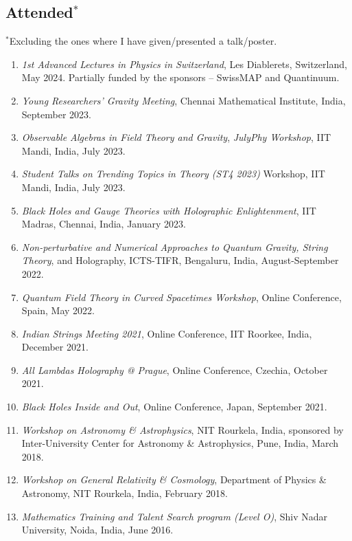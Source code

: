 \documentclass[11pt, letterpaper]{article}
\begin{document}
	\subsection{Attended$^*$}
	$^*$Excluding the ones where I have given/presented a talk/poster.
	\begin{enumerate}
		\item \textit{1st Advanced Lectures in Physics in Switzerland}, Les Diablerets, Switzerland, May 2024. Partially funded by the sponsors -- SwissMAP and Quantinuum.
		
		\item \textit{Young Researchers' Gravity Meeting}, Chennai Mathematical Institute, India, September 2023.
		
		\item \textit{Observable Algebras in Field Theory and Gravity}, \textit{JulyPhy Workshop}, IIT Mandi, India, July 2023.
		
		\item \textit{Student Talks on Trending Topics in Theory (ST4 2023)} Workshop, IIT Mandi, India, July 2023.
		
		\item \textit{Black Holes and Gauge Theories with Holographic Enlightenment}, IIT Madras, Chennai, India, January 2023.
		
		\item \textit{Non-perturbative and Numerical Approaches to Quantum Gravity, String Theory}, and Holography, ICTS-TIFR, Bengaluru, India, August-September 2022.

		\item \textit{Quantum Field Theory in Curved Spacetimes Workshop}, Online Conference, Spain, May 2022.

		\item \textit{Indian Strings Meeting 2021}, Online Conference, IIT Roorkee, India, December 2021.

		\item \textit{All Lambdas Holography @ Prague}, Online Conference, Czechia, October 2021.

		\item \textit{Black Holes Inside and Out}, Online Conference, Japan, September 2021.

		\item\textit{Workshop on Astronomy \& Astrophysics}, NIT Rourkela, India, sponsored by Inter-University Center for Astronomy \& Astrophysics, Pune, India, March 2018.

		\item \textit{Workshop on General Relativity \& Cosmology}, Department of Physics \& Astronomy, NIT Rourkela, India, February 2018.

		\item \textit{Mathematics Training and Talent Search program (Level O)}, Shiv Nadar University, Noida, India, June 2016.
	\end{enumerate}
\end{document}
